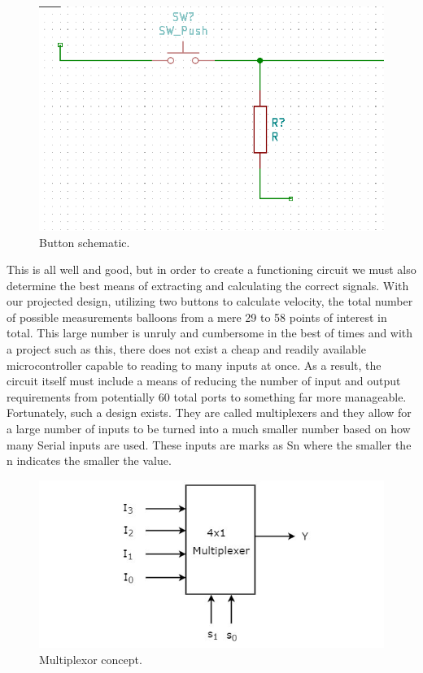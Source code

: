 \begin{figure}[h!]
  \centering
  \includegraphics[width=\linewidth]{image/buttonschematic.png}
  \caption{Button schematic.}
\end{figure}

This is all well and good, but in order to create a functioning circuit we must also
determine the best means of extracting and calculating the correct signals. With our
projected design, utilizing two buttons to calculate velocity, the total number of
possible measurements balloons from a mere 29 to 58 points of interest in total. This
large number is unruly and cumbersome in the best of times and with a project such as
this, there does not exist a cheap and readily available microcontroller capable to
reading to many inputs at once. As a result, the circuit itself must include a means of
reducing the number of input and output requirements from potentially 60 total ports to
something far more manageable. Fortunately, such a design exists. They are called
multiplexers and they allow for a large number of inputs to be turned into a much smaller
number based on how many Serial inputs are used. These inputs are marks as Sn where the
smaller the n indicates the smaller the value.

\begin{figure}[h!]
  \centering
  \includegraphics[width=\linewidth]{image/multiplexorconcept.jpg}
  \caption{Multiplexor concept.}
\end{figure}

